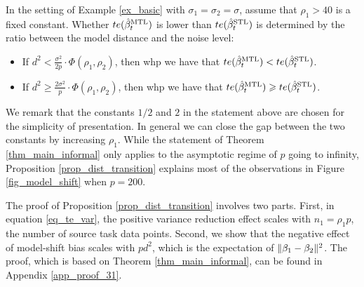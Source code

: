 \begin{proposition}\label{prop_dist_transition}
	In the setting of Example \ref{ex_basic} with $\sigma_1 = \sigma_2 = \sigma$, assume that $\rho_1 > 40$ is a fixed constant.
	Whether $te(\hat{\beta}_t^{\text{MTL}})$ is lower than $te(\hat{\beta}_t^{\text{STL}})$ is determined by the ratio between the model distance and the noise level:
	\begin{itemize}
		\item If ${d^2} < \frac {\sigma^2} {2p} \cdot \Phi(\rho_1, \rho_2)$, then whp we have that $te(\hat{\beta}_t^{\text{MTL}}) < te(\hat{\beta}_t^{\text{STL}})$.
		\item If ${d^2} \ge \frac {2\sigma^2} {p} \cdot \Phi(\rho_1, \rho_2)$, then whp we have that $te(\hat{\beta}_t^{\text{MTL}}) \geqslant te(\hat{\beta}_t^{\text{STL}})$.
	\end{itemize}
\end{proposition}

We remark that the constants $1/2$ and $2$ in the statement above are chosen for the simplicity of presentation.
In general we can close the gap between the two constants by increasing $\rho_1$.
While the statement of Theorem \ref{thm_main_informal} only applies to the asymptotic regime of $p$ going to infinity, Proposition \ref{prop_dist_transition} explains most of the observations in Figure \ref{fig_model_shift} when $p = 200$.

The proof of Proposition \ref{prop_dist_transition} involves two parts.
First, in equation \eqref{eq_te_var}, the positive variance reduction effect scales with $n_1 = \rho_1 p$, the number of source task data points.
Second, we show that the negative effect of model-shift bias scales with $pd^2$, which is the expectation of $\|\beta_1 - \beta_2\|^2$.
The proof, which is based on Theorem \ref{thm_main_informal}, can be found in Appendix \ref{app_proof_31}. %

